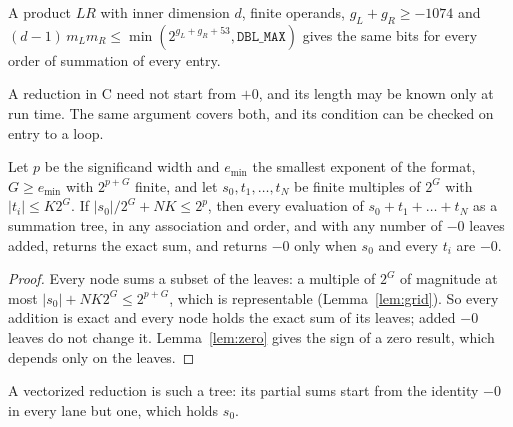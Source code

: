 \documentclass[acmsmall,review,anonymous,nonacm]{acmart}
\newcommand{\abs}[1]{\lvert #1\rvert}
\begin{document}
\begin{corollary}\label{cor:reduce}
A product $LR$ with inner dimension $d$, finite operands, $g_L+g_R\ge-1074$ and
$(d-1)\,m_Lm_R\le\min(2^{g_L+g_R+53},\texttt{DBL\_MAX})$ gives the same bits
for every order of summation of every entry.
\end{corollary}

A reduction in C need not start from $+0$, and its length may be known only at
run time. The same argument covers both, and its condition can be checked on
entry to a loop.
\begin{proposition}\label{prop:guard}
Let $p$ be the significand width and $e_{\min}$ the smallest exponent of the
format, $G\ge e_{\min}$ with $2^{p+G}$ finite, and let $s_0, t_1,\dots,t_N$ be finite multiples of
$2^G$ with $\abs{t_i}\le K2^G$. If
$\abs{s_0}/2^G + NK \le 2^p$, then every evaluation of
$s_0+t_1+\dots+t_N$ as a summation tree, in any association and order, and with
any number of $-0$ leaves added, returns the exact sum, and returns $-0$ only
when $s_0$ and every $t_i$ are $-0$.
\end{proposition}
\begin{proof}
Every node sums a subset of the leaves: a multiple of $2^G$ of magnitude at most
$\abs{s_0}+NK2^G\le2^{p+G}$, which is representable (Lemma~\ref{lem:grid}). So
every addition is exact and every node holds the exact sum of its leaves; added
$-0$ leaves do not change it. Lemma~\ref{lem:zero} gives the sign of a zero
result, which depends only on the leaves.
\end{proof}
A vectorized reduction is such a tree: its partial sums start from the
identity $-0$ in every lane but one, which holds $s_0$.
\end{document}
